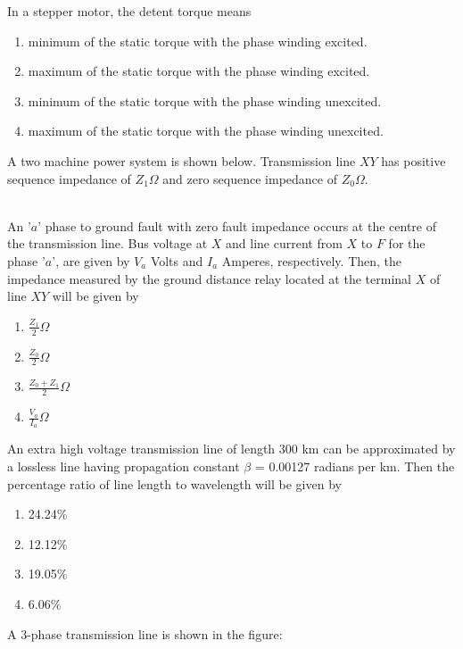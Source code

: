 \item In a stepper motor, the detent torque means
\begin{enumerate}
    \item minimum of the static torque with the phase winding excited.
    \item maximum of the static torque with the phase winding excited.
    \item minimum of the static torque with the phase winding unexcited.
    \item maximum of the static torque with the phase winding unexcited. \\
\end{enumerate}
\item A two machine power system is shown below. Transmission line $XY$ has positive sequence impedance of $Z_1 \Omega$ and zero sequence impedance of $Z_0 \Omega$. 
\begin{figure}[!ht]
\centering
\resizebox{0.5\textwidth}{!}{%

}%
\end{figure} \\
An '$a$' phase to ground fault with zero fault impedance occurs at the centre of the transmission line. Bus voltage at $X$ and line current from $X$ to $F$ for the phase '$a$', are given by $V_a$ Volts and $I_a$ Amperes, respectively. Then, the impedance measured by the ground distance relay located at the terminal $X$ of line $XY$ will be given by
\begin{enumerate}
   \item $\frac{Z_1}{2} \Omega$
   \item $\frac{Z_0}{2} \Omega$
   \item $\frac{Z_0+Z_1}{2} \Omega$
   \item $\frac{V_a}{I_a} \Omega$ \\
\end{enumerate}
\item An extra high voltage transmission line of length 300 km can be approximated by a lossless line having propagation constant $\beta$ = 0.00127 radians per km. Then the percentage ratio of line length to wavelength will be given by
\begin{enumerate}
    \item 24.24\%
    \item 12.12\%
    \item 19.05\%
    \item 6.06\% \\
\end{enumerate}
\item A 3-phase transmission line is shown in the figure:\\
